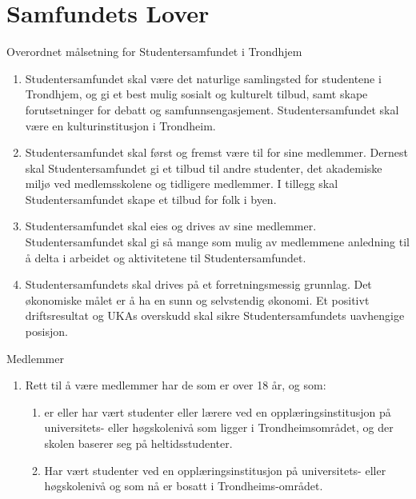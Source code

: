 
\chapter*{Samfundets Lover}

\begin{lovkapittel}{}

\begin{lovparagraf}{Overordnet målsetning for Studentersamfundet i Trondhjem}

    \begin{enumerate}
        \item Studentersamfundet skal være det naturlige samlingsted for studentene i Trondhjem, og gi
            et best mulig sosialt og kulturelt tilbud, samt skape forutsetninger for debatt og
            samfunnsengasjement. Studentersamfundet skal være en kulturinstitusjon i Trondheim.
        \item Studentersamfundet skal først og fremst være til for sine medlemmer. Dernest
            skal Studentersamfundet gi et tilbud til andre studenter, det akademiske miljø
            ved medlemsskolene og tidligere medlemmer. I tillegg skal Studentersamfundet
            skape et tilbud for folk i byen.
	\item Studentersamfundet skal eies og drives av sine medlemmer. Studentersamfundet skal gi så mange som mulig 
	av medlemmene anledning til å delta i arbeidet og aktivitetene til Studentersamfundet.
	\item Studentersamfundets skal drives på et forretningsmessig grunnlag. Det økonomiske målet er å ha en sunn og 
	selvstendig økonomi. Et positivt driftsresultat og UKAs overskudd skal sikre Studentersamfundets
	uavhengige posisjon.

    \end{enumerate}
\end{lovparagraf}





\begin{lovparagraf}{Medlemmer}

  \begin{enumerate}
    \item Rett til å være medlemmer har de som er over 18 år, og som:
      
      \begin{enumerate}
      \item er eller har vært studenter eller lærere ved en opplæringsinstitusjon på universitets- eller høgskolenivå
      som ligger i Trondheimsområdet, og der skolen baserer seg på heltidsstudenter.
      \item Har vært studenter ved en opplæringsinstitusjon på universitets- eller høgskolenivå og som nå er bosatt i
      Trondheims-området.
      \end{enumerate}
      

\end{enumerate}
\end{lovparagraf}
\end{lovkapittel}
